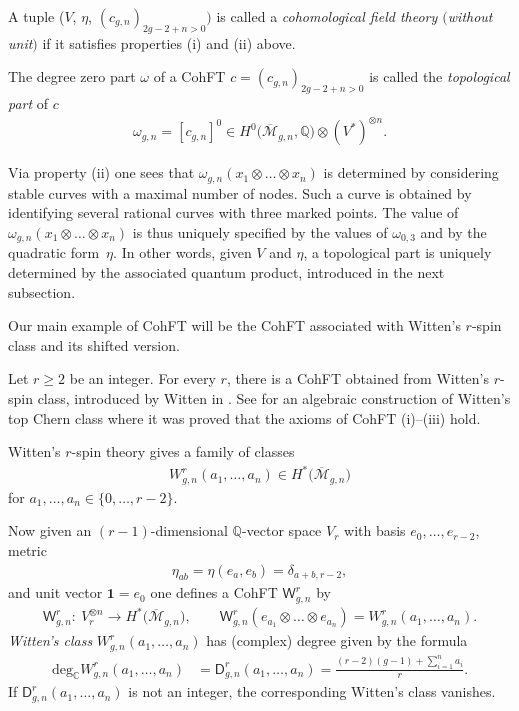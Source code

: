 \documentclass[pdftex]{sigma}
\def\oM{\overline{\mathcal{M}}}
\def\C{\mathbb{C}}
\def\b1{{\mathbf 1}}
\def\W{\mathsf{W}}
\def\D{\mathsf{D}}
\numberwithin{equation}{section}
\begin{document}
\begin{Remark}\label{cohunit}
A tuple ($V$, $\eta$, $(c_{g,n})_{2g-2+n>0})$ is called a {\em cohomological field theory $($without unit$)$} if it satisfies properties (i) and (ii) above.
\end{Remark}

The degree zero part $\omega$ of a CohFT $c= (c_{g,n})_{2g-2+n>0}$ is called the \emph{topological part} of $c$
 \begin{align*}
 \omega_{g,n} = [c_{g,n}]^0 \in H^0\big(\oM_{g,n},\mathbb{Q}\big) \otimes
(V^*)^{\otimes n}.
 \end{align*}

Via property (ii) one sees that $\omega_{g,n}(x_1 \otimes \dots \otimes x_n)$
is determined by considering stable curves with a maximal number of nodes.
Such a curve is obtained by identifying several rational curves with three marked points. The value of $\omega_{g,n}(x_1 \otimes \dots \otimes x_n)$ is
thus uniquely specified by the values of $\omega_{0,3}$ and by the quadratic form~$\eta$. In other words, given $V$ and $\eta$, a topological part is uniquely determined by the associated quantum product, introduced in the next subsection.

Our main example of CohFT will be the CohFT associated with Witten's $r$-spin class and its shifted version.
\begin{Example}
Let $r\geq2$ be an integer. For every $r$, there is a CohFT obtained from
Witten's $r$-spin class, introduced by Witten in \cite{Witten}. See \cite{P,PV} for an algebraic construction of Witten's top Chern class where
it was proved that the axioms of CohFT (i)--(iii) hold.

Witten's $r$-spin theory gives a family of classes
\begin{align*}
W^r_{g,n}(a_1, \dots, a_n) \in H^*\big(\oM_{g,n}\big) \end{align*}
for $a_1, \dots, a_n \in \{0, \dots, r-2 \}$.

Now given an $(r-1)$-dimensional $\mathbb{Q}$-vector space $V_r$ with basis
 $e_0, \dots, e_{r-2}$, metric
\begin{align*}
\eta_{ab} = \eta(e_a, e_b) =\delta_{a+b,r-2} ,
\end{align*}
and unit vector $\b1 = e_0$ one defines a CohFT $\W^r_{g,n}$ by
\begin{align*}
\W^r_{g,n}\colon\ V_r^{\otimes n} \rightarrow H^*\big(\oM_{g,n}\big),
\qquad
\W^r_{g,n}( e_{a_1} \otimes \dots \otimes e_{a_n}) =
W^r_{g,n}(a_1, \dots, a_n) .
\end{align*}
\emph{Witten's class} $W^r_{g,n}(a_1, \dots, a_n)$ has (complex) degree given
by the formula
\begin{align*}%
\text{deg}_{\C} W^r_{g,n}(a_1, \dots, a_n) & =
\D^r_{g,n}(a_1, \dots, a_n) = \frac{(r-2)(g-1) + \sum_{i=1}^n a_i}{r} .
\end{align*}
If $\D^r_{g,n}(a_1, \dots, a_n)$ is not an integer, the corresponding
Witten's class vanishes.
\end{Example}
\end{document}
